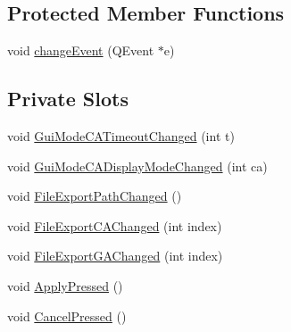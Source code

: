 \subsection*{Protected Member Functions}
\begin{DoxyCompactItemize}
\item 
void \hyperlink{classCWidgetExport_ade6f164eed254a2ea1bf24bc21476522}{changeEvent} (QEvent $\ast$e)
\end{DoxyCompactItemize}
\subsection*{Private Slots}
\begin{DoxyCompactItemize}
\item 
void \hyperlink{classCWidgetExport_adf47bf479d792c80723ab22e1aea0465}{GuiModeCATimeoutChanged} (int t)
\item 
void \hyperlink{classCWidgetExport_af48eb2f412398a4e902b44df7e9f2a72}{GuiModeCADisplayModeChanged} (int ca)
\item 
void \hyperlink{classCWidgetExport_a2eea5bb37bb71fde552228db4bad0fbd}{FileExportPathChanged} ()
\item 
void \hyperlink{classCWidgetExport_af13bcc06e192560f5c306d54d267c43c}{FileExportCAChanged} (int index)
\item 
void \hyperlink{classCWidgetExport_a791cea634360998bf2e12584ce533bd7}{FileExportGAChanged} (int index)
\item 
void \hyperlink{classCWidgetExport_a7ca1b32fdd9e190b55d9a9615330428d}{ApplyPressed} ()
\item 
void \hyperlink{classCWidgetExport_a6f65d412e920fe19eb7aba4d375e626e}{CancelPressed} ()
\end{DoxyCompactItemize}
